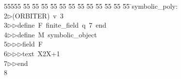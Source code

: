 %
%
\begin{tabbing}
55555 \= 55 \= 55 \= 55 \= 55 \= 55 \= 55 \= 55 \= 55 \= 55 \= 55 \= 55 \= 55 \= \>symbolic\_poly:\\[0pt]
2\>$\triangleright$\>(ORBITER)\ v\ 3\ \\[0pt]
3\>$\triangleright$\>$\triangleright$\>define\ F\ finite\_field\ q\ 7\ end\ \\[0pt]
4\>$\triangleright$\>$\triangleright$\>define\ M\ symbolic\_object\ \\[0pt]
5\>$\triangleright$\>$\triangleright$\>$\triangleright$\>field\ F\ \\[0pt]
6\>$\triangleright$\>$\triangleright$\>$\triangleright$\>text\ X2X+1\\[0pt]
7\>$\triangleright$\>$\triangleright$\>end\ \\[0pt]
8\>\end{tabbing}
